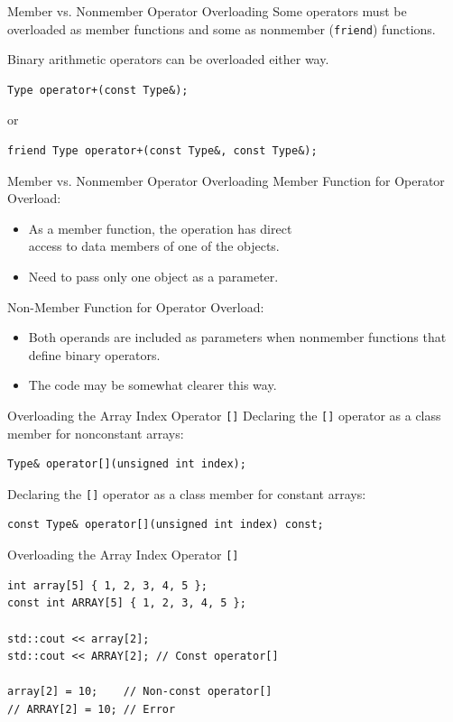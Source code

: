 \documentclass[14pt,aspectratio=1610, hyperref={pdfpagelayout=SinglePage}]{beamer}
\begin{document}
\begin{frame}[fragile]{Member vs. Nonmember Operator Overloading}
Some operators must be overloaded as member functions and some as nonmember (\lstinline{friend}) functions.

Binary arithmetic operators can be overloaded either way.
  \begin{lstlisting}
Type operator+(const Type&);
\end{lstlisting}
  or
\begin{lstlisting}
friend Type operator+(const Type&, const Type&);
\end{lstlisting}
\end{frame}

\begin{frame}[fragile]{Member vs. Nonmember Operator Overloading}
Member Function for Operator Overload:
\begin{itemize}
  \item
    As a member function, the operation has direct\\ access to data
    members of one of the objects.
  \item
    Need to pass only one object as a parameter.
\end{itemize}

Non-Member Function for Operator Overload:
\begin{itemize}
  \item
    Both operands are included as parameters when nonmember functions that define binary operators.
  \item
    The code may be somewhat clearer this way.
\end{itemize}
\end{frame}

\begin{frame}[fragile]{Overloading the Array Index Operator \texttt{[]}}
Declaring the \lstinline{[]} operator as a class member for
  nonconstant arrays:
\begin{lstlisting}
Type& operator[](unsigned int index);
\end{lstlisting}

Declaring the \lstinline{[]} operator as a class member for
  constant arrays:
\begin{lstlisting}
const Type& operator[](unsigned int index) const;
\end{lstlisting}
\end{frame}

\begin{frame}[fragile]{Overloading the Array Index Operator \texttt{[]}}
\begin{lstlisting}
int array[5] { 1, 2, 3, 4, 5 };
const int ARRAY[5] { 1, 2, 3, 4, 5 };

std::cout << array[2];
std::cout << ARRAY[2]; // Const operator[]

array[2] = 10;    // Non-const operator[]
// ARRAY[2] = 10; // Error
\end{lstlisting}
\end{frame}
\end{document}
